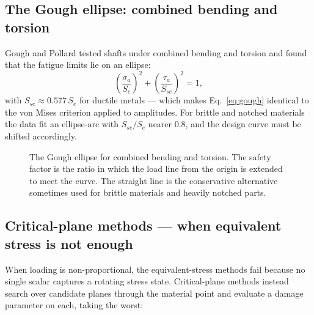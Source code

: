 \documentclass[11pt,a4paper]{article}
\begin{document}
\subsection{The Gough ellipse: combined bending and torsion}
Gough and Pollard tested shafts under combined bending and torsion and found that the fatigue limits lie on an ellipse:
\begin{equation}
  \left(\frac{\sigma_a}{S_e}\right)^{2}+\left(\frac{\tau_a}{S_{se}}\right)^{2}=1 ,
  \label{eq:gough}
\end{equation}
with $S_{se}\approx0.577\,S_e$ for ductile metals --- which makes Eq.~\eqref{eq:gough} identical to the von Mises criterion applied to amplitudes. For brittle and notched materials the data fit an ellipse-arc with $S_{se}/S_e$ nearer 0.8, and the design curve must be shifted accordingly.

\begin{figure}[H]\centering
{}
\caption{The Gough ellipse for combined bending and torsion. The safety factor is the ratio in which the load line from the origin is extended to meet the curve. The straight line is the conservative alternative sometimes used for brittle materials and heavily notched parts.}
\label{fig:gough}
\end{figure}

\subsection{Critical-plane methods --- when equivalent stress is not enough}
When loading is non-proportional, the equivalent-stress methods fail because no single scalar captures a rotating stress state. Critical-plane methods instead search over candidate planes through the material point and evaluate a damage parameter on each, taking the worst:
\end{document}
